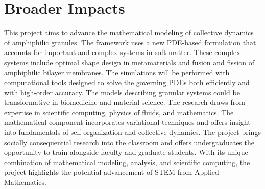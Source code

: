 \section{Broader Impacts}
\label{sec:BroaderImpacts}
This project aims to advance the mathematical modeling of collective
dynamics of amphiphilic granules. The framework uses a new PDE-based
formulation that accounts for important and complex systems in soft
matter. These complex systems include optimal shape design in
metamaterials and fusion and fission of amphiphilic bilayer membranes.
The simulations will be performed with computational tools designed to
solve the governing PDEs both efficiently and with high-order accuracy.
The models describing granular systems could be transformative in
biomedicine and material science. The research draws from expertise in
scientific computing, physics of fluids, and mathematics. The
mathematical component incorporates variational techniques and offers
insight into fundamentals of self-organization and collective dynamics.
The project brings socially consequential research into the classroom
and offers undergraduates the opportunity to train alongside faculty and
graduate students. With its unique combination of mathematical modeling,
analysis, and scientific computing, the project highlights the potential
advancement of STEM from Applied Mathematics.

